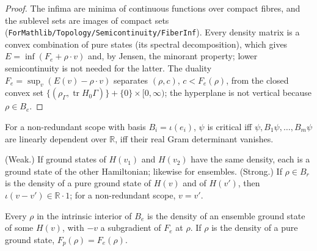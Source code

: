\begin{proof}
  \leanok
  The infima are minima of continuous functions over compact fibres, and the sublevel sets are images of compact sets
  (\texttt{ForMathlib/Topology/Semicontinuity/FiberInf}). Every density matrix is a convex combination of pure states (its
  spectral decomposition), which gives $E=\inf(F_e+\rho\cdot v)$ and, by Jensen, the minorant property; lower semicontinuity is
  not needed for the latter. The duality $F_e=\sup_v(E(v)-\rho\cdot v)$ separates $(\rho,c)$, $c<F_e(\rho)$, from the closed convex set
  $\{(\rho_\Gamma,\operatorname{tr}H_0\Gamma)\}+\{0\}\times[0,\infty)$; the hyperplane is not vertical because $\rho\in B_e$.
\end{proof}

\begin{theorem}\label{thm:scope-critical}
  \leanok
  For a non-redundant scope with basis $B_i=\iota(e_i)$, $\psi$ is critical iff $\psi,B_1\psi,\dots,B_m\psi$ are linearly dependent
  over $\mathbb R$, iff their real Gram determinant vanishes.
\end{theorem}

\begin{theorem}\label{thm:scope-hk}
  \leanok
  (Weak.) If ground states of $H(v_1)$ and $H(v_2)$ have the same density, each is a ground state of the other Hamiltonian;
  likewise for ensembles. (Strong.) If $\rho\in B_r$ is the density of a pure ground state of $H(v)$ and of $H(v')$, then
  $\iota(v-v')\in\mathbb R\cdot1$; for a non-redundant scope, $v=v'$.
\end{theorem}

\begin{theorem}\label{thm:scope-ens-vrep}
  \leanok
  Every $\rho$ in the intrinsic interior of $B_e$ is the density of an ensemble ground state of some $H(v)$, with $-v$ a
  subgradient of $F_e$ at $\rho$. If $\rho$ is the density of a pure ground state, $F_p(\rho)=F_e(\rho)$.
\end{theorem}

